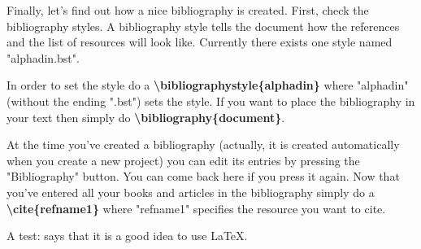 \documentclass{article}
\begin{document}
Finally, let's find out how a nice bibliography is created. First, check the bibliography styles. A bibliography style tells the document how the references and the list of resources will look like. Currently there exists one style named "alphadin.bst".

In order to set the style do a \textbf{\textbackslash bibliographystyle\{alphadin\}} where "alphadin" (without the ending ".bst") sets the style. If you want to place the bibliography in your text then simply do \textbf{\textbackslash bibliography\{document\}}.

At the time you've created a bibliography (actually, it is created automatically when you create a new project) you can edit its entries by pressing the "Bibliography" button. You can come back here if you press it again. Now that you've entered all your books and articles in the bibliography simply do a \textbf{\textbackslash cite\{refname1\}} where "refname1" specifies the resource you want to cite.

A test: \cite{referenceName1} says that it is a good idea to use LaTeX.



\end{document}
